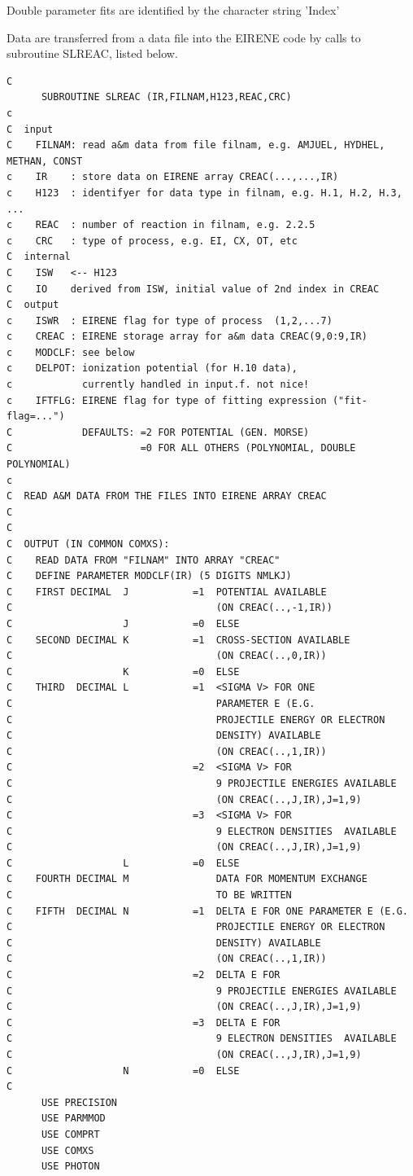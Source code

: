 \documentclass[12pt,dvipdfmx]{article}
\begin{document}
Double parameter fits are identified by the character string
'Index'


Data are transferred from a data file into the EIRENE code by
calls to subroutine SLREAC, listed below.

\begin{small}\begin{verbatim}
C
      SUBROUTINE SLREAC (IR,FILNAM,H123,REAC,CRC)
c
C  input
C    FILNAM: read a&m data from file filnam, e.g. AMJUEL, HYDHEL, METHAN, CONST
c    IR    : store data on EIRENE array CREAC(...,...,IR)
c    H123  : identifyer for data type in filnam, e.g. H.1, H.2, H.3, ...
c    REAC  : number of reaction in filnam, e.g. 2.2.5
c    CRC   : type of process, e.g. EI, CX, OT, etc
C  internal
C    ISW   <-- H123
C    IO    derived from ISW, initial value of 2nd index in CREAC
C  output
c    ISWR  : EIRENE flag for type of process  (1,2,...7)
c    CREAC : EIRENE storage array for a&m data CREAC(9,0:9,IR)
c    MODCLF: see below
c    DELPOT: ionization potential (for H.10 data),
c            currently handled in input.f. not nice!
c    IFTFLG: EIRENE flag for type of fitting expression ("fit-flag=...")
C            DEFAULTS: =2 FOR POTENTIAL (GEN. MORSE)
C                      =0 FOR ALL OTHERS (POLYNOMIAL, DOUBLE POLYNOMIAL)
c
C  READ A&M DATA FROM THE FILES INTO EIRENE ARRAY CREAC
C
C
C  OUTPUT (IN COMMON COMXS):
C    READ DATA FROM "FILNAM" INTO ARRAY "CREAC"
C    DEFINE PARAMETER MODCLF(IR) (5 DIGITS NMLKJ)
C    FIRST DECIMAL  J           =1  POTENTIAL AVAILABLE
C                                   (ON CREAC(..,-1,IR))
C                   J           =0  ELSE
C    SECOND DECIMAL K           =1  CROSS-SECTION AVAILABLE
C                                   (ON CREAC(..,0,IR))
C                   K           =0  ELSE
C    THIRD  DECIMAL L           =1  <SIGMA V> FOR ONE
C                                   PARAMETER E (E.G.
C                                   PROJECTILE ENERGY OR ELECTRON
C                                   DENSITY) AVAILABLE
C                                   (ON CREAC(..,1,IR))
C                               =2  <SIGMA V> FOR
C                                   9 PROJECTILE ENERGIES AVAILABLE
C                                   (ON CREAC(..,J,IR),J=1,9)
C                               =3  <SIGMA V> FOR
C                                   9 ELECTRON DENSITIES  AVAILABLE
C                                   (ON CREAC(..,J,IR),J=1,9)
C                   L           =0  ELSE
C    FOURTH DECIMAL M               DATA FOR MOMENTUM EXCHANGE
C                                   TO BE WRITTEN
C    FIFTH  DECIMAL N           =1  DELTA E FOR ONE PARAMETER E (E.G.
C                                   PROJECTILE ENERGY OR ELECTRON
C                                   DENSITY) AVAILABLE
C                                   (ON CREAC(..,1,IR))
C                               =2  DELTA E FOR
C                                   9 PROJECTILE ENERGIES AVAILABLE
C                                   (ON CREAC(..,J,IR),J=1,9)
C                               =3  DELTA E FOR
C                                   9 ELECTRON DENSITIES  AVAILABLE
C                                   (ON CREAC(..,J,IR),J=1,9)
C                   N           =0  ELSE
C
      USE PRECISION
      USE PARMMOD
      USE COMPRT
      USE COMXS
      USE PHOTON


\end{verbatim}
\end{small}
\end{document}
